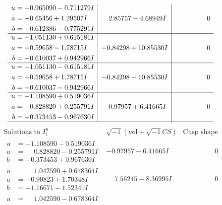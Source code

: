 \documentclass[1p]{elsarticle_modified}
\theoremstyle{definition}
\newcommand{\I}{\sqrt{-1}}
\begin{document}
$$\begin{array}{c|c|c}
\begin{aligned}
u &= -0.965090 - 0.711279 I \\
a &= -0.65456 + 1.29507 I \\
b &= -0.612386 - 0.775291 I\end{aligned}
 & \phantom{-}2.85757 - 4.68949 I & \phantom{-0.000000 } 0 \\ \hline\begin{aligned}
u &= -1.051130 + 0.615181 I \\
a &= -0.59658 - 1.78715 I \\
b &= -0.610037 + 0.942966 I\end{aligned}
 & -0.84298 + 10.85530 I & \phantom{-0.000000 } 0 \\ \hline\begin{aligned}
u &= -1.051130 - 0.615181 I \\
a &= -0.59658 + 1.78715 I \\
b &= -0.610037 - 0.942966 I\end{aligned}
 & -0.84298 - 10.85530 I & \phantom{-0.000000 } 0 \\ \hline\begin{aligned}
u &= -1.108590 + 0.519036 I \\
a &= \phantom{-}0.828820 + 0.255791 I \\
b &= -0.373453 - 0.967630 I\end{aligned}
 & -0.97957 + 6.41665 I & \phantom{-0.000000 } 0\\
 \hline 
 \end{array}$$\newpage$$\begin{array}{c|c|c}  
\text{Solutions to }I^u_{1}& \I (\text{vol} + \sqrt{-1}CS) & \text{Cusp shape}\\
 \hline 
\begin{aligned}
u &= -1.108590 - 0.519036 I \\
a &= \phantom{-}0.828820 - 0.255791 I \\
b &= -0.373453 + 0.967630 I\end{aligned}
 & -0.97957 - 6.41665 I & \phantom{-0.000000 } 0 \\ \hline\begin{aligned}
u &= \phantom{-}1.042590 + 0.678364 I \\
a &= -0.90823 + 1.70348 I \\
b &= -1.16671 - 1.52341 I\end{aligned}
 & \phantom{-}7.56245 - 8.36995 I & \phantom{-0.000000 } 0 \\ \hline\begin{aligned}
u &= \phantom{-}1.042590 - 0.678364 I \\

\end{aligned}
\end{array}$$
\end{document}

